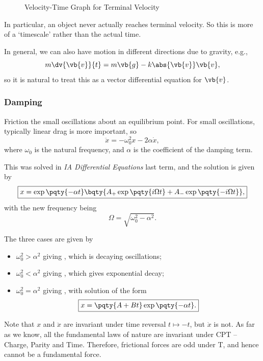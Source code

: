 \begin{figure}[ht!]
    \centering

    \caption{Velocity-Time Graph for Terminal Velocity}
    \label{fig:vt-graph-terminal-velocity}%
\end{figure}

In particular, an object never actually reaches terminal velocity. So this is more of a `timescale' rather than the actual time.

In general, we can also have motion in different directions due to gravity, e.g.,
\begin{equation}
    m \dv{\vb{v}}{t} = m \vb{g} - k \abs{\vb{v}} \vb{v},
\end{equation}
so it is natural to treat this as a vector differential equation for \(\vb{v}\).

\subsubsection{Damping}

Friction  the small oscillations about an equilibrium point. For small oscillations, typically linear drag is more important, so
\begin{equation}
    \ddot{x} = - \omega_0^2 x - 2 \alpha \dot{x},
\end{equation}
where \(\omega_0\) is the natural frequency, and \(\alpha\) is the coefficient of the damping term.

This was solved in \textit{IA Differential Equations} last term, and the solution is given by
\begin{equation}
    \boxed{x = \exp\pqty{- \alpha t} \bqty{A_+ \exp\pqty{i \Omega t} + A_- \exp\pqty{- i \Omega t}},}
\end{equation}
with the new frequency being
\begin{equation}
    \boxed{\Omega = \sqrt{\omega_0^2 - \alpha^2}.}
\end{equation}

The three cases are given by
\begin{itemize}
    \item \(\omega_0^2 > \alpha^2\) giving , which is decaying oscillations;
    \item \(\omega_0^2 < \alpha^2\) giving , which gives exponential decay;
    \item \(\omega_0^2 = \alpha^2\) giving , with solution of the form
    \begin{equation}
        \boxed{x = \pqty{A + Bt} \exp\pqty{-\alpha t}.}
    \end{equation}
\end{itemize}

Note that \(x\) and \(\ddot{x}\) are invariant under time reversal \(t \mapsto -t\), but \(\dot{x}\) is not. As far as we know, all the fundamental laws of nature are invariant under CPT -- Charge, Parity and Time. Therefore, frictional forces are odd under T, and hence cannot be a fundamental force.